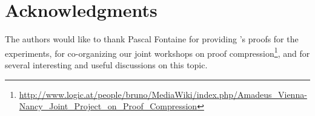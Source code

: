 \documentclass{llncs}
\begin{document}
\section*{Acknowledgments}

The authors would like to thank Pascal Fontaine for providing {\veriT}'s proofs for the experiments,
for co-organizing our joint workshops on proof
compression\footnote{\url{http://www.logic.at/people/bruno/MediaWiki/index.php/Amadeus_Vienna-Nancy_Joint_Project_on_Proof_Compression}},
and for several interesting and useful discussions on this topic.









%
%
%
%
\end{document}
